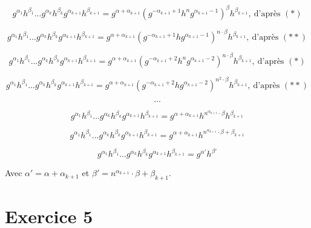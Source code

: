 \documentclass[]{article}
\theoremstyle{remark}
\theoremstyle{definition}
\begin{document}
$$g^{\alpha_1} h^{\beta_1} ... g^{\alpha_k} h^{\beta_k} g^{\alpha_{k+1}} h^{\beta_{k+1}} = g^{\alpha + \alpha_{k+1}} \left(g^{-\alpha_{k+1} + 1} h^n g^{\alpha_{k+1} - 1}\right)^\beta h^{\beta_{k+1}}, ~ \text{d'après } (*)$$

$$g^{\alpha_1} h^{\beta_1} ... g^{\alpha_k} h^{\beta_k} g^{\alpha_{k+1}} h^{\beta_{k+1}} = g^{\alpha + \alpha_{k+1}} \left(g^{-\alpha_{k+1} + 1} h g^{\alpha_{k+1} - 1}\right)^{n \cdot \beta} h^{\beta_{k+1}}, ~ \text{d'après } (**)$$

$$g^{\alpha_1} h^{\beta_1} ... g^{\alpha_k} h^{\beta_k} g^{\alpha_{k+1}} h^{\beta_{k+1}} = g^{\alpha + \alpha_{k+1}} \left(g^{-\alpha_{k+1} + 2} h^n g^{\alpha_{k+1} - 2}\right)^{n \cdot \beta} h^{\beta_{k+1}}, ~ \text{d'après } (*)$$

$$g^{\alpha_1} h^{\beta_1} ... g^{\alpha_k} h^{\beta_k} g^{\alpha_{k+1}} h^{\beta_{k+1}} = g^{\alpha + \alpha_{k+1}} \left(g^{-\alpha_{k+1} + 2} h g^{\alpha_{k+1} - 2}\right)^{n^2 \cdot \beta} h^{\beta_{k+1}}, ~ \text{d'après } (**)$$

$$...$$

$$g^{\alpha_1} h^{\beta_1} ... g^{\alpha_k} h^{\beta_k} g^{\alpha_{k+1}} h^{\beta_{k+1}} = g^{\alpha + \alpha_{k+1}} h^{n^{\alpha_{k+1}} \cdot \beta} h^{\beta_{k+1}}$$

$$g^{\alpha_1} h^{\beta_1} ... g^{\alpha_k} h^{\beta_k} g^{\alpha_{k+1}} h^{\beta_{k+1}} = g^{\alpha + \alpha_{k+1}} h^{n^{\alpha_{k+1}} \cdot \beta + \beta_{k+1}}$$

$$g^{\alpha_1} h^{\beta_1} ... g^{\alpha_k} h^{\beta_k} g^{\alpha_{k+1}} h^{\beta_{k+1}} = g^{\alpha'} h^{\beta'}$$

Avec $\alpha' = \alpha + \alpha_{k+1}$ et $\beta' = n^{\alpha_{k+1}} \cdot \beta + \beta_{k+1}$.

\section*{Exercice 5}
\end{document}
